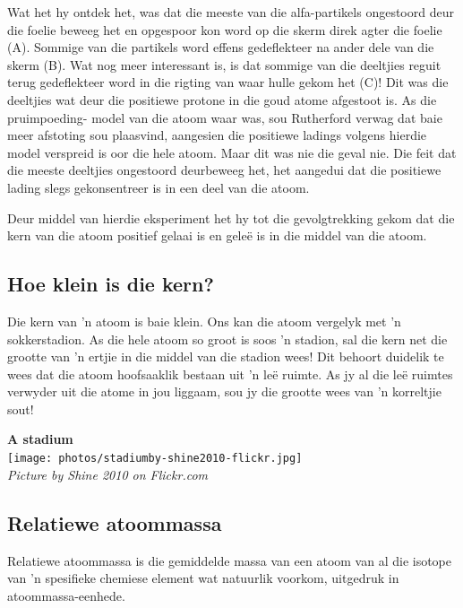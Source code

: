 Wat het hy ontdek het, was dat die meeste van die alfa-partikels ongestoord deur die foelie beweeg het en opgespoor kon word op die skerm direk agter die foelie (A). Sommige van die partikels word effens gedeflekteer na ander dele van die skerm (B). Wat nog meer interessant is, is dat sommige van die deeltjies reguit terug gedeflekteer word in die rigting van waar hulle gekom het (C)! Dit was die deeltjies wat deur die positiewe protone in die goud atome afgestoot is. As die pruimpoeding- model van die atoom waar was, sou Rutherford verwag dat baie meer afstoting sou plaasvind, aangesien die positiewe ladings volgens hierdie model verspreid is oor die hele atoom. Maar dit was nie die geval nie. Die feit dat die meeste deeltjies ongestoord deurbeweeg het, het aangedui dat die positiewe lading slegs gekonsentreer is in een deel van die atoom.\par 

Deur middel van hierdie eksperiment het hy tot die gevolgtrekking gekom dat die kern van die atoom positief gelaai is en gele\"{e} is in die middel van die atoom.
\subsection*{Hoe klein is die kern?}
\begin{minipage}{.5\textwidth}
Die kern van 'n atoom is baie klein. Ons kan die atoom vergelyk met 'n sokkerstadion. As die hele atoom so groot is soos 'n stadion, sal die kern net die grootte van 'n ertjie in die middel van die stadion wees! Dit behoort duidelik te wees dat die atoom hoofsaaklik bestaan uit  'n leë ruimte. As jy al die leë ruimtes verwyder uit die atome in jou liggaam, sou jy die grootte wees van 'n korreltjie sout!
\end{minipage}
\begin{minipage}{.5\textwidth}
\begin{center}
\textbf{A stadium}\\
 \texttt{[image: photos/stadiumby-shine2010-flickr.jpg]}\\
\textit{Picture by Shine 2010 on Flickr.com}
\end{center}
\end{minipage}
      
            \subsection*{Relatiewe atoommassa}
            \nopagebreak
{} {Relatiewe atoommassa is die gemiddelde massa van een atoom van al die isotope van  'n spesifieke chemiese element wat natuurlik voorkom, uitgedruk in atoommassa-eenhede.} 


